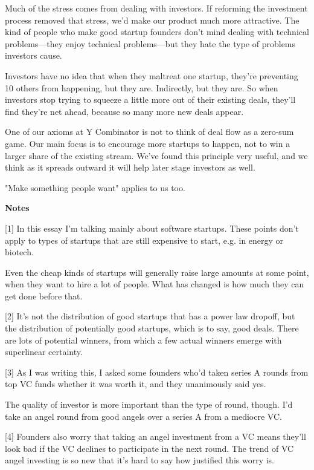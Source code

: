 Much of the stress comes from dealing with investors.  If reforming
the investment process removed that stress, we'd make our product
much more attractive.  The kind of people who make good startup
founders don't mind dealing with technical problems---they enjoy
technical problems---but they hate the type of problems investors
cause.

Investors have no
idea that when they maltreat one startup, they're preventing 10
others from happening, but they are.  Indirectly, but they are.  So
when investors stop trying to squeeze a little more out of their
existing deals, they'll find they're net ahead, because so many
more new deals appear.

One of our axioms at Y Combinator is not to think of deal flow as
a zero-sum game.  Our main focus is to encourage more startups to happen,
not to win a larger share of the existing stream.  We've found this
principle very useful, and we think as it spreads outward it will
help later stage investors as well.

"Make something people want"
applies to us too.





\textbf{Notes}

[1]
In this essay I'm talking mainly about software startups.
These points don't apply to types of startups that are still expensive
to start, e.g. in energy or biotech.

Even the cheap kinds of startups will generally raise large amounts
at some point, when they want to hire a lot of people.  What has
changed is how much they can get done before that.

[2]
It's not the distribution of good startups that has a power
law dropoff, but the distribution of potentially good startups,
which is to say, good deals.  There are lots of potential winners,
from which a few actual winners emerge with superlinear certainty.

[3]
As I was writing this, I asked some founders who'd taken
series A rounds from top VC funds whether it was worth it, and they
unanimously said yes.

The quality of investor is more important than the type of round,
though.  I'd take an angel round from good angels over a series A
from a mediocre VC.

[4]
Founders also worry that taking an angel investment from a
VC means they'll look bad if the VC declines to participate in the
next round.  The trend of VC angel investing is so new that it's
hard to say how justified this worry is.

